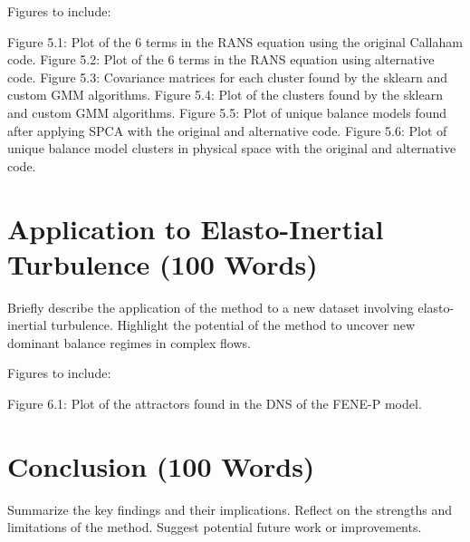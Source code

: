 \documentclass[12pt]{report} %
\begin{document}
Figures to include:

Figure 5.1: Plot of the 6 terms in the RANS equation using the original Callaham code.
Figure 5.2: Plot of the 6 terms in the RANS equation using alternative code.
Figure 5.3: Covariance matrices for each cluster found by the sklearn and custom GMM algorithms.
Figure 5.4: Plot of the clusters found by the sklearn and custom GMM algorithms.
Figure 5.5: Plot of unique balance models found after applying SPCA with the original and alternative code.
Figure 5.6: Plot of unique balance model clusters in physical space with the original and alternative code.


\section{Application to Elasto-Inertial Turbulence (100 Words)}

Briefly describe the application of the method to a new dataset involving elasto-inertial turbulence.
Highlight the potential of the method to uncover new dominant balance regimes in complex flows.

Figures to include:

Figure 6.1: Plot of the attractors found in the DNS of the FENE-P model.

\section{Conclusion (100 Words)}

Summarize the key findings and their implications.
Reflect on the strengths and limitations of the method.
Suggest potential future work or improvements.





\end{document}
